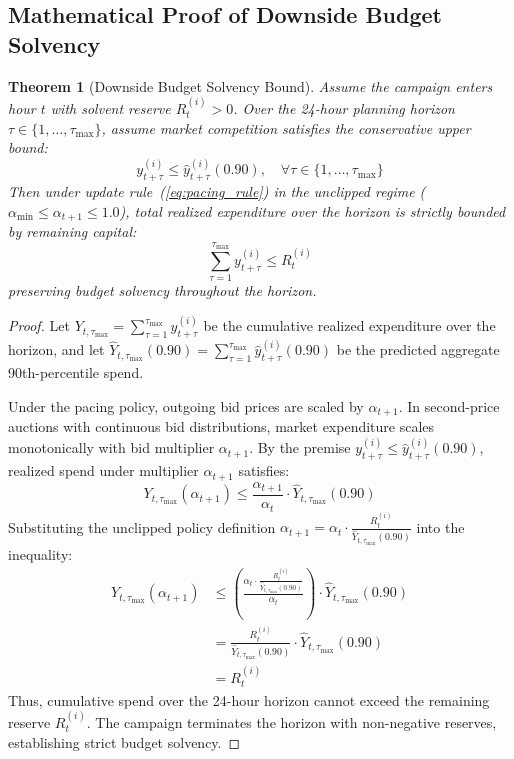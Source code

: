 \documentclass[11pt,a4paper]{article}
\newtheorem{theorem}{Theorem}[section]
\begin{document}
\subsection{Mathematical Proof of Downside Budget Solvency}

\begin{theorem}[Downside Budget Solvency Bound]
Assume the campaign enters hour $t$ with solvent reserve $R_t^{(i)} > 0$. Over the 24-hour planning horizon $\tau \in \{1, \dots, \tau_{\max}\}$, assume market competition satisfies the conservative upper bound:
\begin{equation}
    y_{t+\tau}^{(i)} \le \hat{y}_{t+\tau}^{(i)}(0.90), \quad \forall \tau \in \{1, \dots, \tau_{\max}\}
\end{equation}
Then under update rule~(\ref{eq:pacing_rule}) in the unclipped regime ($\alpha_{\min} \le \alpha_{t+1} \le 1.0$), total realized expenditure over the horizon is strictly bounded by remaining capital:
\begin{equation}
    \sum_{\tau=1}^{\tau_{\max}} y_{t+\tau}^{(i)} \le R_t^{(i)}
\end{equation}
preserving budget solvency throughout the horizon.
\end{theorem}

\begin{proof}
Let $Y_{t, \tau_{\max}} = \sum_{\tau=1}^{\tau_{\max}} y_{t+\tau}^{(i)}$ be the cumulative realized expenditure over the horizon, and let $\hat{Y}_{t, \tau_{\max}}(0.90) = \sum_{\tau=1}^{\tau_{\max}} \hat{y}_{t+\tau}^{(i)}(0.90)$ be the predicted aggregate 90th-percentile spend.

Under the pacing policy, outgoing bid prices are scaled by $\alpha_{t+1}$. In second-price auctions with continuous bid distributions, market expenditure scales monotonically with bid multiplier $\alpha_{t+1}$. By the premise $y_{t+\tau}^{(i)} \le \hat{y}_{t+\tau}^{(i)}(0.90)$, realized spend under multiplier $\alpha_{t+1}$ satisfies:
\begin{equation}
    Y_{t, \tau_{\max}}(\alpha_{t+1}) \le \frac{\alpha_{t+1}}{\alpha_t} \cdot \hat{Y}_{t, \tau_{\max}}(0.90)
\end{equation}
Substituting the unclipped policy definition $\alpha_{t+1} = \alpha_t \cdot \frac{R_t^{(i)}}{\hat{Y}_{t, \tau_{\max}}(0.90)}$ into the inequality:
\begin{align}
    Y_{t, \tau_{\max}}(\alpha_{t+1}) &\le \left(\frac{\alpha_t \cdot \frac{R_t^{(i)}}{\hat{Y}_{t, \tau_{\max}}(0.90)}}{\alpha_t}\right) \cdot \hat{Y}_{t, \tau_{\max}}(0.90) \\
    &= \frac{R_t^{(i)}}{\hat{Y}_{t, \tau_{\max}}(0.90)} \cdot \hat{Y}_{t, \tau_{\max}}(0.90) \\
    &= R_t^{(i)}
\end{align}
Thus, cumulative spend over the 24-hour horizon cannot exceed the remaining reserve $R_t^{(i)}$. The campaign terminates the horizon with non-negative reserves, establishing strict budget solvency.
\end{proof}
\end{document}
